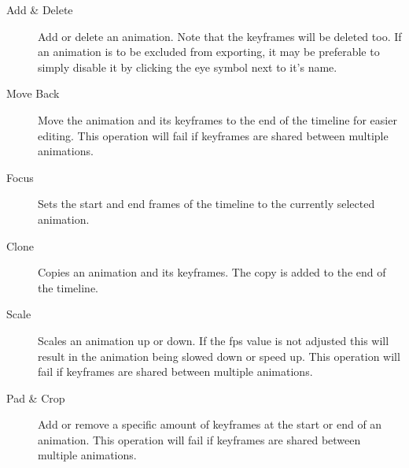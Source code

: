 \begin{description}
    \item[Add \& Delete] Add or delete an animation. Note that the keyframes will be deleted too. If an animation is to be excluded from exporting, it may be preferable to simply disable it by clicking the eye symbol next to it's name.
    \item[Move Back] Move the animation and its keyframes to the end of the timeline for easier editing. This operation will fail if keyframes are shared between multiple animations.
    \item[Focus] Sets the start and end frames of the timeline to the currently selected animation.
    \item[Clone] Copies an animation and its keyframes. The copy is added to the end of the timeline.
    \item[Scale] Scales an animation up or down. If the fps value is not adjusted this will result in the animation being slowed down or speed up. This operation will fail if keyframes are shared between multiple animations.
    \item[Pad \& Crop] Add or remove a specific amount of keyframes at the start or end of an animation. This operation will fail if keyframes are shared between multiple animations.
\end{description}